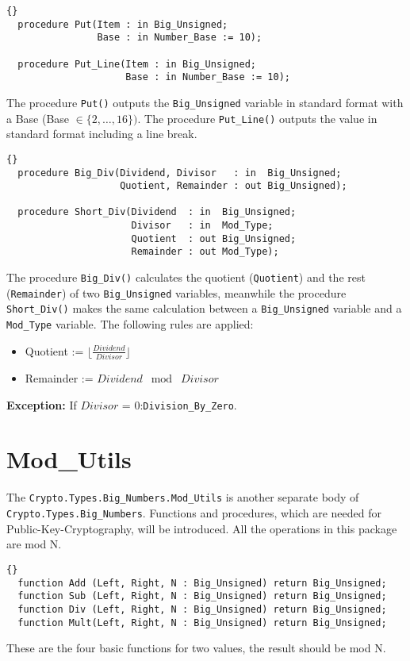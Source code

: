 \hhline
\begin{lstlisting}{}
  procedure Put(Item : in Big_Unsigned;
                Base : in Number_Base := 10);

  procedure Put_Line(Item : in Big_Unsigned;
                     Base : in Number_Base := 10);
\end{lstlisting}
The procedure \texttt{Put()} outputs the \texttt{Big\_Unsigned}
variable in standard format with a Base (Base $\in \{2,\ldots
,16\})$. The procedure \texttt{Put\_Line()} outputs the value in
standard format including a line break.

\hhline
\begin{lstlisting}{}
  procedure Big_Div(Dividend, Divisor   : in  Big_Unsigned;
                    Quotient, Remainder : out Big_Unsigned);

  procedure Short_Div(Dividend  : in  Big_Unsigned;
                      Divisor   : in  Mod_Type;
                      Quotient  : out Big_Unsigned;
                      Remainder : out Mod_Type);
\end{lstlisting}
The procedure \texttt{Big\_Div()} calculates the quotient
(\texttt{Quotient}) and the rest (\texttt{Remainder}) of two
\texttt{Big\_Unsigned} variables, meanwhile the procedure
\texttt{Short\_Div()} makes the same calculation between a
\texttt{Big\_Unsigned} variable and a \texttt{Mod\_Type} variable. The
following rules are applied:
\begin{itemize}
\item Quotient := $\lfloor \frac{Dividend}{Divisor} \rfloor$
\item Remainder :=  $Dividend\; \bmod\; Divisor$
\end{itemize}
\textbf{Exception:} If $Divisor$ = 0:\quad \texttt{Division\_By\_Zero}.



\section{Mod\_Utils}
The \texttt{Crypto.Types.Big\_Numbers.Mod\_Utils} is another separate
body of \texttt{Crypto.Types.\-Big\_Numbers}. Functions and
procedures, which are needed for Public-Key-Cryptography, will be
introduced. All the operations in this package are mod N.
\begin{lstlisting}{}
  function Add (Left, Right, N : Big_Unsigned) return Big_Unsigned;
  function Sub (Left, Right, N : Big_Unsigned) return Big_Unsigned;
  function Div (Left, Right, N : Big_Unsigned) return Big_Unsigned;
  function Mult(Left, Right, N : Big_Unsigned) return Big_Unsigned;
\end{lstlisting}
These are the four basic functions for two values, the result should be mod N.\\

